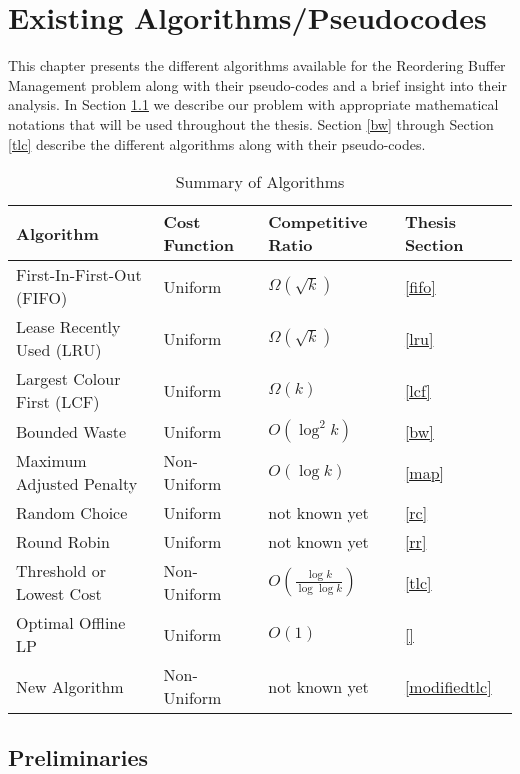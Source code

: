 \chapter{Existing Algorithms/Pseudocodes} \label{algorithms}

This chapter presents the different algorithms available for the Reordering Buffer Management problem along with their pseudo-codes and a brief insight into their analysis. In Section \ref{preliminaries} we describe our problem with appropriate mathematical notations that will be used throughout the thesis. Section \ref{bw} through Section \ref{tlc} describe the different algorithms along with their pseudo-codes. 

\begin{table}[ht]
\label{implalgo}
\caption{Summary of Algorithms}
\centering
\begin{tabular}{l l l l}
\hline \hline
Algorithm & Cost Function & Competitive Ratio & Thesis Section \\
\hline
First-In-First-Out (FIFO) & Uniform & $\Omega(\sqrt{k})$ & \ref{fifo} \\ 
Lease Recently Used (LRU) & Uniform & $\Omega(\sqrt{k})$ & \ref{lru} \\ 
Largest Colour First (LCF) & Uniform & $\Omega(k)$ & \ref{lcf} \\ 
Bounded Waste & Uniform & $O(\log^2 k)$ & \ref{bw} \\
Maximum Adjusted Penalty &  Non-Uniform & $O(\log k)$ & \ref{map} \\
Random Choice & Uniform & not known yet & \ref{rc} \\
Round Robin & Uniform & not known yet & \ref{rr} \\
Threshold or Lowest Cost & Non-Uniform & $O(\frac{\log k}{\log \log k})$ & \ref{tlc} \\
Optimal Offline LP & Uniform & $O(1)$ & \ref{} \\
New Algorithm & Non-Uniform & not known yet & \ref{modifiedtlc} \\
\hline
\end{tabular}
\end{table}

\section{Preliminaries} \label{preliminaries}

